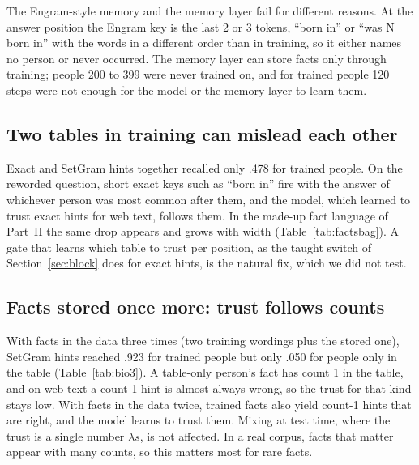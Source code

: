 \documentclass[11pt]{article}
\begin{document}
The Engram-style memory and the memory layer fail for different reasons. At the answer position the Engram key is the last 2 or 3 tokens, ``born in'' or ``was N born in'' with the words in a different order than in training, so it either names no person or never occurred. The memory layer can store facts only through training; people 200 to 399 were never trained on, and for trained people 120 steps were not enough for the model or the memory layer to learn them.

\subsection{Two tables in training can mislead each other}
Exact and SetGram hints together recalled only .478 for trained people. On the reworded question, short exact keys such as ``born in'' fire with the answer of whichever person was most common after them, and the model, which learned to trust exact hints for web text, follows them. In the made-up fact language of Part~II the same drop appears and grows with width (Table~\ref{tab:factsbag}). A gate that learns which table to trust per position, as the taught switch of Section~\ref{sec:block} does for exact hints, is the natural fix, which we did not test.

\subsection{Facts stored once more: trust follows counts}
With facts in the data three times (two training wordings plus the stored one), SetGram hints reached .923 for trained people but only .050 for people only in the table (Table~\ref{tab:bio3}). A table-only person's fact has count 1 in the table, and on web text a count-1 hint is almost always wrong, so the trust for that kind stays low. With facts in the data twice, trained facts also yield count-1 hints that are right, and the model learns to trust them. Mixing at test time, where the trust is a single number $\lambda s$, is not affected. In a real corpus, facts that matter appear with many counts, so this matters most for rare facts.
\end{document}
